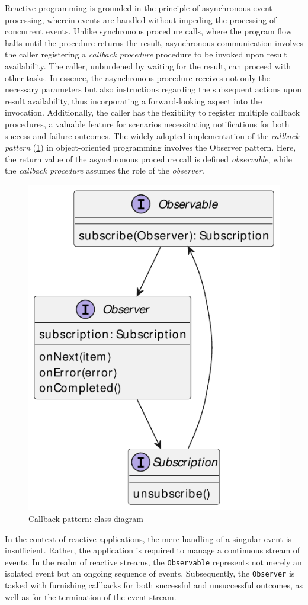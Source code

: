 \documentclass[12pt,a4paper,openright,twoside]{book}
\begin{document}
Reactive programming is grounded in the principle of asynchronous event processing, wherein events are handled without impeding the processing of concurrent events. Unlike synchronous procedure calls, where the program flow halts until the procedure returns the result, asynchronous communication involves the caller registering a \textit{callback procedure} procedure to be invoked upon result availability. The caller, unburdened by waiting for the result, can proceed with other tasks. In essence, the asynchronous procedure receives not only the necessary parameters but also instructions regarding the subsequent actions upon result availability, thus incorporating a forward-looking aspect into the invocation. Additionally, the caller has the flexibility to register multiple callback procedures, a valuable feature for scenarios necessitating notifications for both success and failure outcomes. The widely adopted implementation of the \textit{callback pattern} (\cref{fig:callback-pattern}) in object-oriented programming involves the Observer pattern. Here, the return value of the asynchronous procedure call is defined \textit{observable}, while the \textit{callback procedure} assumes the role of the \textit{observer}.

\begin{figure}
    \centering
    \includegraphics[width=.5\linewidth]{figures/callback-pattern.pdf}
    \caption{Callback pattern: class diagram}
    \label{fig:callback-pattern}
\end{figure}

In the context of reactive applications, the mere handling of a singular event is insufficient. Rather, the application is required to manage a continuous stream of events. In the realm of reactive streams, the \texttt{Observable} represents not merely an isolated event but an ongoing sequence of events. Subsequently, the \texttt{Observer} is tasked with furnishing callbacks for both successful and unsuccessful outcomes, as well as for the termination of the event stream.
\end{document}
